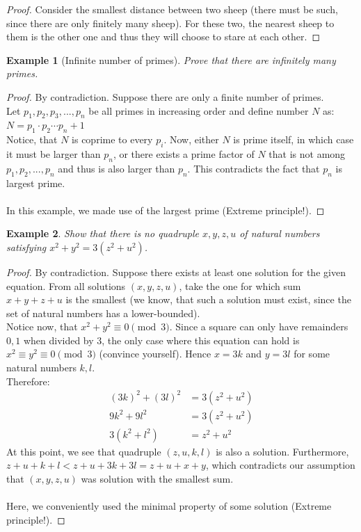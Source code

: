 \documentclass[12pt]{article}
\newtheorem{theorem}{Example}
\begin{document}
\begin{proof}
Consider the smallest distance between two sheep (there must be such, since there are only finitely many sheep). For these two, the nearest sheep to them is the other one and thus they will choose to stare at each other.
\end{proof}

\begin{theorem}[Infinite number of primes]
Prove that there are infinitely many primes.
\end{theorem}

\begin{proof}
By contradiction. Suppose there are only a finite number of primes. \\ Let $p_{1}, p_{2}, p_{3}, ..., p_{n}$ be all primes in increasing order and define number $N$ as: \\
$N = p_{1} \cdot p_{2} \cdots p_{n} + 1$ \\
Notice, that $N$ is coprime to every $p_{i}$.
Now, either $N$ is prime itself, in which case it must be larger than $p_{n}$, or there exists a prime factor of $N$ that is not among $p_{1}, p_{2}, ..., p_{n}$ and thus is also larger than $p_{n}$. This contradicts the fact that $p_{n}$ is largest prime. \qedhere
\\\\
In this example, we made use of the largest prime (Extreme principle!).
\end{proof}

\begin{theorem}
Show that there is no quadruple $x, y, z, u$ of natural numbers satisfying
$x^{2} + y^{2} = 3(z^{2} + u^{2})$.
\end{theorem}

\begin{proof}
By contradiction. Suppose there exists at least one solution for the given equation. From all solutions $(x, y, z, u)$, take the one for which sum $x + y + z + u$ is the smallest (we know, that such a solution must exist, since the set of natural numbers has a lower-bounded). \\
Notice now, that $x^{2} + y^{2} \equiv 0 \pmod 3$. Since a square can only have remainders $0, 1$ when divided by $3$, the only case where this equation can hold is $x^{2} \equiv y^{2} \equiv 0 \pmod 3$ (convince yourself). Hence $x = 3k$ and $y = 3l$ for some natural numbers $k, l$. \\
Therefore:
\begin{align*}
{(3k)}^{2} + {(3l)}^{2} &= 3(z^{2} + u^{2})\\
9k^{2} + 9l^{2} &= 3(z^{2} + u^{2}) \\
3(k^{2} + l^{2}) &= z^{2} + u^{2}
\end{align*}
At this point, we see that quadruple $(z, u, k, l)$ is also a solution. Furthermore, $z + u + k + l < z + u + 3k + 3l = z + u + x + y$, which contradicts our assumption that $(x, y, z, u)$ was solution with the smallest sum. \qedhere
\\\\
Here, we conveniently used the minimal property of some solution (Extreme principle!).
\end{proof}
\end{document}
